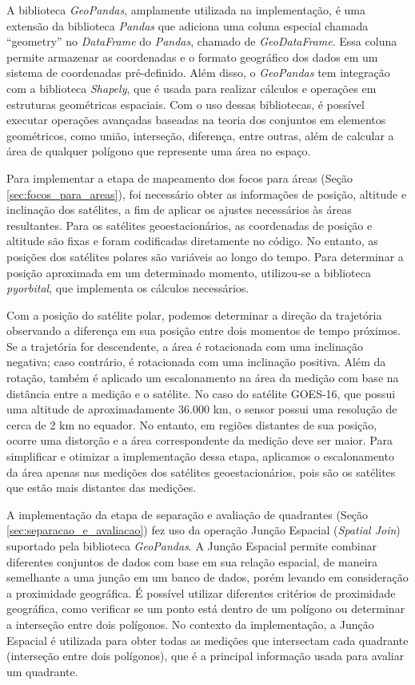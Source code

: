 \documentclass[cic,tc]{iiufrgs}
\begin{document}
A biblioteca \textit{GeoPandas}, amplamente utilizada na implementação, é uma extensão da biblioteca \textit{Pandas} que adiciona uma coluna especial chamada ``geometry'' no \textit{DataFrame} do \textit{Pandas}, chamado de \textit{GeoDataFrame}. Essa coluna permite armazenar as coordenadas e o formato geográfico dos dados em um sistema de coordenadas pré-definido. Além disso, o \textit{GeoPandas} tem integração com a biblioteca \textit{Shapely}, que é usada para realizar cálculos e operações em estruturas geométricas espaciais. Com o uso dessas bibliotecas, é possível executar operações avançadas baseadas na teoria dos conjuntos em elementos geométricos, como união, interseção, diferença, entre outras, além de calcular a área de qualquer polígono que represente uma área no espaço.

Para implementar a etapa de mapeamento dos focos para áreas (Seção \ref{sec:focos_para_areas}), foi necessário obter as informações de posição, altitude e inclinação dos satélites, a fim de aplicar os ajustes necessários às áreas resultantes. Para os satélites geoestacionários, as coordenadas de posição e altitude são fixas e foram codificadas diretamente no código. No entanto, as posições dos satélites polares são variáveis ao longo do tempo. Para determinar a posição aproximada em um determinado momento, utilizou-se a biblioteca \textit{pyorbital}, que implementa os cálculos necessários.

Com a posição do satélite polar, podemos determinar a direção da trajetória observando a diferença em sua posição entre dois momentos de tempo próximos. Se a trajetória for descendente, a área é rotacionada com uma inclinação negativa; caso contrário, é rotacionada com uma inclinação positiva. Além da rotação, também é aplicado um escalonamento na área da medição com base na distância entre a medição e o satélite. No caso do satélite GOES-16, que possui uma altitude de aproximadamente 36.000 km, o sensor possui uma resolução de cerca de 2 km no equador. No entanto, em regiões distantes de sua posição, ocorre uma distorção e a área correspondente da medição deve ser maior. Para simplificar e otimizar a implementação dessa etapa, aplicamos o escalonamento da área apenas nas medições dos satélites geoestacionários, pois são os satélites que estão mais distantes das medições.

A implementação da etapa de separação e avaliação de quadrantes (Seção \ref{sec:separacao_e_avaliacao}) fez uso da operação Junção Espacial (\textit{Spatial Join}) suportado pela biblioteca \textit{GeoPandas}. A Junção Espacial permite combinar diferentes conjuntos de dados com base em sua relação espacial, de maneira semelhante a uma junção em um banco de dados, porém levando em consideração a proximidade geográfica. É possível utilizar diferentes critérios de proximidade geográfica, como verificar se um ponto está dentro de um polígono ou determinar a interseção entre dois polígonos. No contexto da implementação, a Junção Espacial é utilizada para obter todas as medições que intersectam cada quadrante (interseção entre dois polígonos), que é a principal informação usada para avaliar um quadrante.
\end{document}
